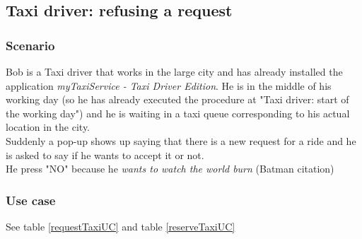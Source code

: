 \subsection{Taxi driver: refusing a request}
\subsubsection{Scenario}
Bob is a Taxi driver that works in the large city and has already installed the application \textit{myTaxiService - Taxi Driver Edition}.
He is in the middle of his working day (so he has already executed the procedure at "Taxi driver: start of the working day") and he is waiting in a taxi queue corresponding to his actual location in the city.\\
Suddenly a pop-up shows up saying that there is a new request for a ride and he is asked to say if he wants to accept it or not.\\
He press "NO" because he \textit{wants to watch the world burn} (Batman citation)

\subsubsection{Use case}
See table \ref{requestTaxiUC} and table \ref{reserveTaxiUC}